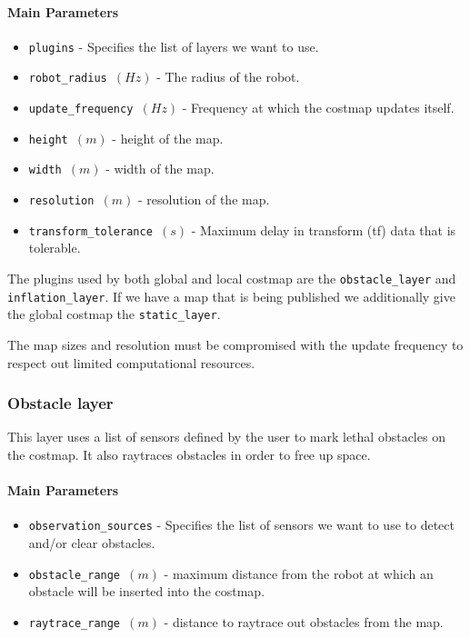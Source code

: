 \documentclass[12pt]{article}
\begin{document}
\paragraph{Main Parameters}
\begin{itemize}[label={}]
    \item \texttt{plugins} - Specifies the list of layers we want to use.
    \item \texttt{robot\_radius $(Hz)$} - The radius of the robot.
    \item \texttt{update\_frequency $(Hz)$} - Frequency at which the costmap updates itself.
    \item \texttt{height $(m)$} - height of the map.
    \item \texttt{width $(m)$} - width  of the map.
    \item \texttt{resolution $(m)$} - resolution  of the map.
    \item \texttt{transform\_tolerance $(s)$} - Maximum delay in transform (tf) data that is tolerable.
\end{itemize}

The plugins used by both global and local costmap are the \texttt{obstacle\_layer} and \texttt{inflation\_layer}. If we have a map that is being published we additionally  give the global costmap the  \texttt{static\_layer}.

The map sizes and resolution must be compromised with the update frequency to respect out limited computational resources.

\subsubsection{Obstacle layer}
This layer uses a list of sensors defined by the user to mark lethal obstacles on the costmap. It also raytraces obstacles in order to free up space.
\paragraph{Main Parameters}

\begin{itemize}[label={}]
    \item \texttt{observation\_sources} - Specifies the list of sensors we want to use to detect and/or clear obstacles.
    \item \texttt{obstacle\_range $(m)$} - maximum distance from the robot at which an obstacle will be inserted into the costmap.
    \item \texttt{raytrace\_range $(m)$} - distance to raytrace out obstacles from the map.
\end{itemize}
\end{document}
